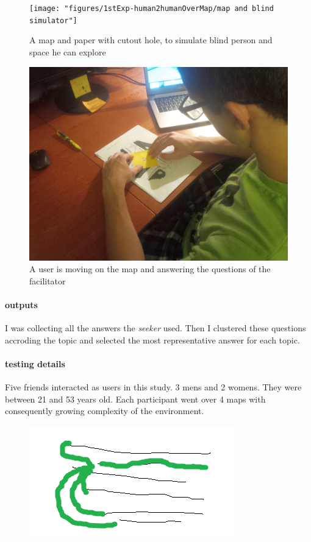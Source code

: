 	\begin{figure}[h]
		\centering
		\texttt{[image: "figures/1stExp-human2humanOverMap/map and blind simulator"]}
		\caption[Map and blind simulator]{A map and paper with cutout hole, to simulate blind person and space he can explore}
		\label{fig:map-and-blind-simulator}
	\end{figure}
	\begin{figure}[h]
		\centering
		\includegraphics[width=0.7\linewidth]{"figures/1stExp-human2humanOverMap/using blind simulator"}
		\caption[User session]{A user is moving on the map and answering the questions of the facilitator}
		\label{fig:user-session}
	\end{figure}
	
	\paragraph{outputs}
	I was collecting all the answers the \emph{seeker} used. Then I clustered these questions accroding the topic and selected the most representative answer for each topic.
	
	\paragraph{testing details}
	Five friends interacted as users in this study. 3 mens and 2 womens. They were between 21 and 53 years old. Each participant went over 4 maps with consequently growing complexity of the environment.

	
	
	
	\begin{figure}[h]
		\centering
		\includegraphics[width=0.7\linewidth]{figures/1stExp-human2humanOverMap/clusteredquestions}
		\caption[Best question for each topic]{}
		\caption{}
		\label{fig:clusteredquestions}
	\end{figure}
	
